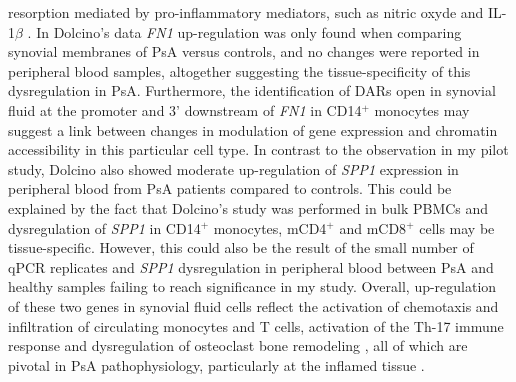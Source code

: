 resorption mediated by pro-inflammatory mediators, such as nitric oxyde and IL-1$\beta$ \parencite{Gramoun2010}.  In Dolcino’s data \textit{FN1} up-regulation was only found when comparing synovial membranes of PsA versus controls, and no changes were reported in peripheral blood samples, altogether suggesting the tissue-specificity of this dysregulation in PsA. Furthermore, the identification of DARs open in synovial fluid at the promoter and 3’ downstream of \textit{FN1} in CD14$^+$ monocytes may suggest a link between changes in modulation of gene expression and chromatin accessibility in this particular cell type. In contrast to the observation in my pilot study, Dolcino also showed moderate up-regulation of \textit{SPP1} expression in peripheral blood from PsA patients compared to controls. This could be explained by the fact that Dolcino's study was performed in bulk PBMCs and dysregulation of \textit{SPP1} in CD14$^+$ monocytes, mCD4$^+$ and mCD8$^+$ cells may be tissue-specific. However, this could also be the result of the small number of qPCR replicates and \textit{SPP1} dysregulation in peripheral blood between PsA and healthy samples failing to reach significance in my study. Overall, up-regulation of these two genes in synovial fluid cells reflect the activation of chemotaxis and  infiltration of circulating monocytes and T cells,  activation of the Th-17 immune response and dysregulation of osteoclast bone remodeling , all of which are pivotal in PsA pathophysiology, particularly at the inflamed tissue \parencite{Durham2015, Mensah2008}.


